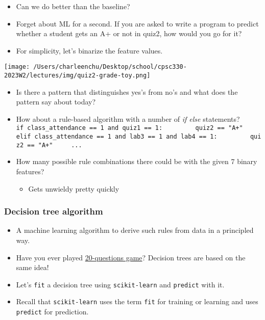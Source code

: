 \documentclass[11pt]{article}
\providecommand{\tightlist}{%
      \setlength{\itemsep}{0pt}\setlength{\parskip}{0pt}}
\begin{document}
\begin{itemize}
\tightlist
\item
  Can we do better than the baseline?
\item
  Forget about ML for a second. If you are asked to write a program to
  predict whether a student gets an A+ or not in quiz2, how would you go
  for it?\\
\item
  For simplicity, let's binarize the feature values.
\end{itemize}

\texttt{[image: /Users/charleenchu/Desktop/school/cpsc330-2023W2/lectures/img/quiz2-grade-toy.png]}

    \begin{itemize}
\tightlist
\item
  Is there a pattern that distinguishes yes's from no's and what does
  the pattern say about today?
\item
  How about a rule-based algorithm with a number of \emph{if else}
  statements?\\
  \texttt{if\ class\_attendance\ ==\ 1\ and\ quiz1\ ==\ 1:\ \ \ \ \ \ \ \ \ quiz2\ ==\ "A+"\ \ \ \ \ elif\ class\_attendance\ ==\ 1\ and\ lab3\ ==\ 1\ and\ lab4\ ==\ 1:\ \ \ \ \ \ \ \ \ quiz2\ ==\ "A+"\ \ \ \ \ ...}
\end{itemize}

    \begin{itemize}
\tightlist
\item
  How many possible rule combinations there could be with the given 7
  binary features?

  \begin{itemize}
  \tightlist
  \item
    Gets unwieldy pretty quickly
  \end{itemize}
\end{itemize}

    \subsubsection{Decision tree algorithm}\label{decision-tree-algorithm}

\begin{itemize}
\tightlist
\item
  A machine learning algorithm to derive such rules from data in a
  principled way.\\
\item
  Have you ever played
  \href{https://en.wikipedia.org/wiki/Twenty_questions}{20-questions
  game}? Decision trees are based on the same idea!
\item
  Let's \texttt{fit} a decision tree using \texttt{scikit-learn} and
  \texttt{predict} with it.
\item
  Recall that \texttt{scikit-learn} uses the term \texttt{fit} for
  training or learning and uses \texttt{predict} for prediction.
\end{itemize}
\end{document}
